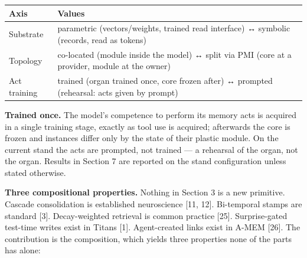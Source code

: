 \documentclass[
]{article}
\newcounter{none} %
\begin{document}
{\def\LTcaptype{none} %
\begin{longtable}[]{@{}
  >{\raggedright\arraybackslash}p{}
  >{\raggedright\arraybackslash}p{}@{}}
\toprule\noalign{}
\begin{minipage}[b]{\linewidth}\raggedright
Axis
\end{minipage} & \begin{minipage}[b]{\linewidth}\raggedright
Values
\end{minipage} \\
\midrule\noalign{}
\endhead
\bottomrule\noalign{}
\endlastfoot
Substrate & parametric (vectors/weights, trained read interface) ↔
symbolic (records, read as tokens) \\
Topology & co-located (module inside the model) ↔ split via PMI (core at
a provider, module at the owner) \\
Act training & trained (organ trained once, core frozen after) ↔
prompted (rehearsal: acts given by prompt) \\
\end{longtable}
}

\textbf{Trained once.} The model's competence to perform its memory acts
is acquired in a single training stage, exactly as tool use is acquired;
afterwards the core is frozen and instances differ only by the state of
their plastic module. On the current stand the acts are prompted, not
trained --- a rehearsal of the organ, not the organ. Results in Section
7 are reported on the stand configuration unless stated otherwise.

\textbf{Three compositional properties.} Nothing in Section 3 is a new
primitive. Cascade consolidation is established neuroscience {[}11,
12{]}. Bi-temporal stamps are standard {[}3{]}. Decay-weighted retrieval
is common practice {[}25{]}. Surprise-gated test-time writes exist in
Titans {[}1{]}. Agent-created links exist in A-MEM {[}26{]}. The
contribution is the composition, which yields three properties none of
the parts has alone:
\end{document}
